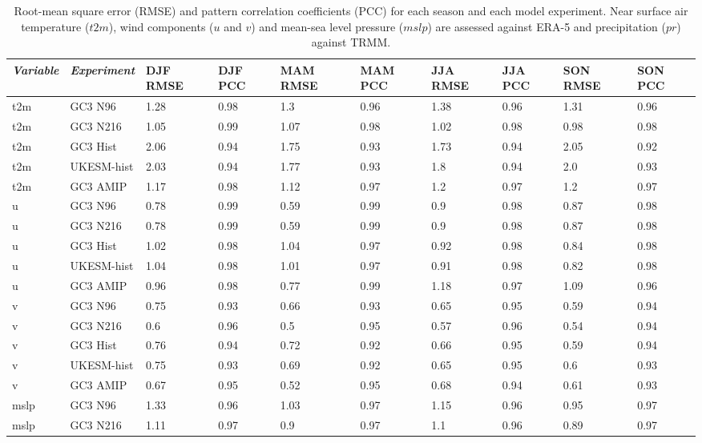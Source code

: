 \begin{table}[t!]
\small
\caption{\small Root-mean square error (RMSE) and pattern correlation coefficients (PCC) for each season and each model experiment. Near surface air temperature ($t2m$), wind components ($u$ and $v$) and mean-sea level pressure ($mslp$) are assessed against ERA-5 and precipitation ($pr$) against TRMM.}
\begin{tabular}{p{1.05cm}|p{2.25cm}|p{1.10cm}p{1.10cm}p{1.10cm}p{1.10cm}p{1.10cm}p{0.9cm}p{1.05cm}p{1.05cm}} \label{tab:s1}
  \textit{Variable}                  & \textit{Experiment}  & DJF RMSE & DJF PCC & MAM RMSE & MAM PCC & JJA RMSE & JJA PCC &  SON RMSE & SON PCC \\ \hline \hline
t2m & GC3 N96 & 1.28 & 0.98 & 1.3 & 0.96 & 1.38 & 0.96 & 1.31 & 0.96 \\
t2m & GC3 N216 & 1.05 & 0.99 & 1.07 & 0.98 & 1.02 & 0.98 & 0.98 & 0.98 \\
t2m & GC3 Hist & 2.06 & 0.94 & 1.75 & 0.93 & 1.73 & 0.94 & 2.05 & 0.92 \\
t2m & UKESM-hist & 2.03 & 0.94 & 1.77 & 0.93 & 1.8 & 0.94 & 2.0 & 0.93 \\
t2m & GC3 AMIP & 1.17 & 0.98 & 1.12 & 0.97 & 1.2 & 0.97 & 1.2 & 0.97 \\
u & GC3 N96 & 0.78 & 0.99 & 0.59 & 0.99 & 0.9 & 0.98 & 0.87 & 0.98 \\
u & GC3 N216 & 0.78 & 0.99 & 0.59 & 0.99 & 0.9 & 0.98 & 0.87 & 0.98 \\
u & GC3 Hist & 1.02 & 0.98 & 1.04 & 0.97 & 0.92 & 0.98 & 0.84 & 0.98 \\
u & UKESM-hist & 1.04 & 0.98 & 1.01 & 0.97 & 0.91 & 0.98 & 0.82 & 0.98 \\
u & GC3 AMIP & 0.96 & 0.98 & 0.77 & 0.99 & 1.18 & 0.97 & 1.09 & 0.96 \\
v & GC3 N96 & 0.75 & 0.93 & 0.66 & 0.93 & 0.65 & 0.95 & 0.59 & 0.94 \\
v & GC3 N216 & 0.6 & 0.96 & 0.5 & 0.95 & 0.57 & 0.96 & 0.54 & 0.94 \\
v & GC3 Hist & 0.76 & 0.94 & 0.72 & 0.92 & 0.66 & 0.95 & 0.59 & 0.94 \\
v & UKESM-hist & 0.75 & 0.93 & 0.69 & 0.92 & 0.65 & 0.95 & 0.6 & 0.93 \\
v & GC3 AMIP & 0.67 & 0.95 & 0.52 & 0.95 & 0.68 & 0.94 & 0.61 & 0.93 \\
mslp & GC3 N96 & 1.33 & 0.96 & 1.03 & 0.97 & 1.15 & 0.96 & 0.95 & 0.97 \\
mslp & GC3 N216 & 1.11 & 0.97 & 0.9 & 0.97 & 1.1 & 0.96 & 0.89 & 0.97 \\

\end{tabular}
\end{table}
